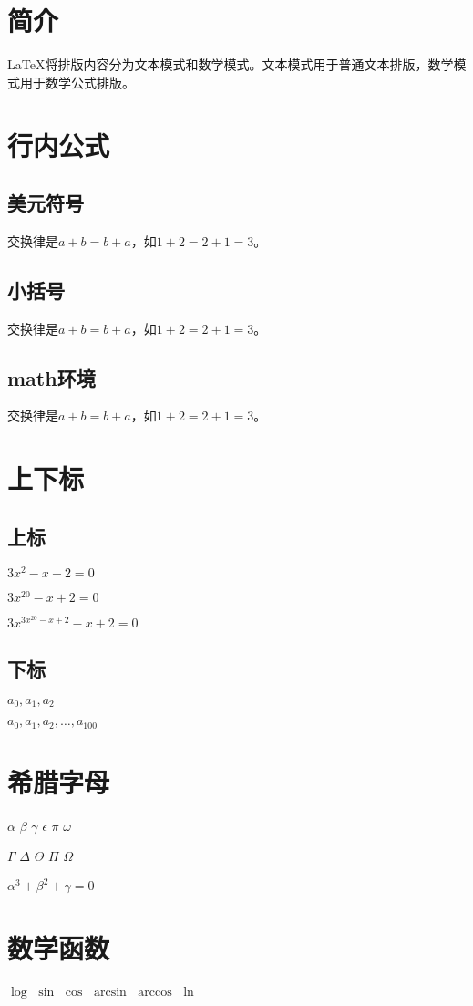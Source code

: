 \documentclass{article}
\begin{document}
    \section{简介}
    \LaTeX{}将排版内容分为文本模式和数学模式。文本模式用于普通文本排版，数学模式用于数学公式排版。
    \section{行内公式}
    \subsection{美元符号}
    交换律是$a+b=b+a$，如$1+2=2+1=3$。
    \subsection{小括号}
    交换律是\(a+b=b+a\)，如\(1+2=2+1=3\)。
    \subsection{math环境}
    交换律是\begin{math}a+b=b+a\end{math}，如\begin{math}1+2=2+1=3\end{math}。
    \section{上下标}
    \subsection{上标}
    $3x^2 - x + 2 = 0$

    $3x^{20} - x + 2 = 0$

    $3x^{3x^{20} - x + 2} - x + 2 = 0$
    \subsection{下标}
    $a_0, a_1, a_2$

    $a_0, a_1, a_2, \dots, a_{100}$
    \section{希腊字母}
    $\alpha$
    $\beta$
    $\gamma$
    $\epsilon$
    $\pi$
    $\omega$

    $\Gamma$
    $\Delta$
    $\Theta$
    $\Pi$
    $\Omega$

    $\alpha^3 + \beta^2 + \gamma = 0$
    \section{数学函数}
    $\log$
    $\sin$
    $\cos$
    $\arcsin$
    $\arccos$
    $\ln$
\end{document}
